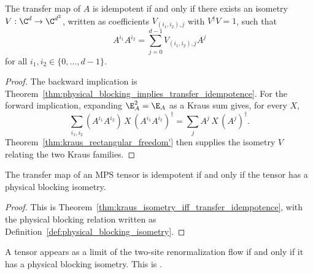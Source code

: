 \begin{theorem}%
    \label{thm:kraus_isometry_iff_transfer_idempotence}
    \leanok
    The transfer map of $A$ is idempotent if and only if there exists an
    isometry $V : \C^d \to \C^{d^2}$, written as coefficients
    $V_{(i_1,i_2),j}$ with $V^\dagger V = 1$, such that
    \begin{equation}\label{eq:corr_AA_isometry}
        A^{i_1} A^{i_2} = \sum_{j=0}^{d-1} V_{(i_1,i_2),j} A^j
    \end{equation}
    for all $i_1,i_2 \in \{0,\ldots,d-1\}$.
\end{theorem}
\begin{proof}\leanok
    The backward implication is
    Theorem~\ref{thm:physical_blocking_implies_transfer_idempotence}. For the
    forward implication,
    expanding $\E_A^2 = \E_A$ as a Kraus sum gives, for every $X$,
    \[
        \sum_{i_1,i_2}(A^{i_1} A^{i_2})\,X\,(A^{i_1} A^{i_2})^\dagger
        = \sum_j A^j\,X\,(A^j)^\dagger .
    \]
    Theorem~\ref{thm:kraus_rectangular_freedom'} then supplies the isometry $V$
    relating the two Kraus families.
\end{proof}

\begin{theorem}
    \label{thm:physical_blocking_isometry_iff_transfer_idempotence}
    \leanok
    The transfer map of an MPS tensor is idempotent if and only if the tensor
    has a physical blocking isometry.
\end{theorem}
\begin{proof}\leanok
    This is Theorem~\ref{thm:kraus_isometry_iff_transfer_idempotence}, with the
    physical blocking relation written as
    Definition~\ref{def:physical_blocking_isometry}.
\end{proof}

\begin{theorem}
    \label{thm:renormalization_flow}
    A tensor appears as a limit of the two-site renormalization flow if and only
    if it has a physical blocking isometry. This is
    \cite[Theorem~3.1]{Cirac2016MPDO_arXiv}.
\end{theorem}

